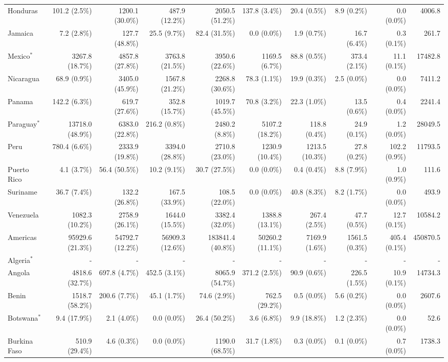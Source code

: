 \begin{scriptsize}
\begin{landscape}
\begin{center}
\begin{longtable}[ht]{lrrrrrrrrr}
			Honduras&101.2 (2.5\%)&1200.1 (30.0\%)&487.9 (12.2\%)&2050.5 (51.2\%)&137.8 (3.4\%)&20.4 (0.5\%)&8.9 (0.2\%)&0.0 (0.0\%)&4006.8\\
			Jamaica&7.2 (2.8\%)&127.7 (48.8\%)&25.5 (9.7\%)&82.4 (31.5\%)&0.0 (0.0\%)&1.9 (0.7\%)&16.7 (6.4\%)&0.3 (0.1\%)&261.7\\
			Mexico$^*$&3267.8 (18.7\%)&4857.8 (27.8\%)&3763.8 (21.5\%)&3950.6 (22.6\%)&1169.5 (6.7\%)&88.8 (0.5\%)&373.4 (2.1\%)&11.1 (0.1\%)&17482.8\\
			Nicaragua&68.9 (0.9\%)&3405.0 (45.9\%)&1567.8 (21.2\%)&2268.8 (30.6\%)&78.3 (1.1\%)&19.9 (0.3\%)&2.5 (0.0\%)&0.0 (0.0\%)&7411.2\\
			Panama&142.2 (6.3\%)&619.7 (27.6\%)&352.8 (15.7\%)&1019.7 (45.5\%)&70.8 (3.2\%)&22.3 (1.0\%)&13.5 (0.6\%)&0.4 (0.0\%)&2241.4\\
			Paraguay$^*$&13718.0 (48.9\%)&6383.0 (22.8\%)&216.2 (0.8\%)&2480.2 (8.8\%)&5107.2 (18.2\%)&118.8 (0.4\%)&24.9 (0.1\%)&1.2 (0.0\%)&28049.5\\
			Peru&780.4 (6.6\%)&2333.9 (19.8\%)&3394.0 (28.8\%)&2710.8 (23.0\%)&1230.9 (10.4\%)&1213.5 (10.3\%)&27.8 (0.2\%)&102.2 (0.9\%)&11793.5\\
			Puerto Rico&4.1 (3.7\%)&56.4 (50.5\%)&10.2 (9.1\%)&30.7 (27.5\%)&0.0 (0.0\%)&0.4 (0.4\%)&8.8 (7.9\%)&1.0 (0.9\%)&111.6\\
			Suriname&36.7 (7.4\%)&132.2 (26.8\%)&167.5 (33.9\%)&108.5 (22.0\%)&0.0 (0.0\%)&40.8 (8.3\%)&8.2 (1.7\%)&0.0 (0.0\%)&493.9\\
			Venezuela&1082.3 (10.2\%)&2758.9 (26.1\%)&1644.0 (15.5\%)&3382.4 (32.0\%)&1388.8 (13.1\%)&267.4 (2.5\%)&47.7 (0.5\%)&12.7 (0.1\%)&10584.2\\\hline
			Americas&95929.6 (21.3\%)&54792.7 (12.2\%)&56909.3 (12.6\%)&183841.4 (40.8\%)&50260.2 (11.1\%)&7169.9 (1.6\%)&1561.5 (0.3\%)&405.4 (0.1\%)&450870.5\\\hline
			Algeria$^*$&-&-&-&-&-&-&-&-&-\\
			Angola&4818.6 (32.7\%)&697.8 (4.7\%)&452.5 (3.1\%)&8065.9 (54.7\%)&371.2 (2.5\%)&90.9 (0.6\%)&226.5 (1.5\%)&10.9 (0.1\%)&14734.3\\
			Benin&1518.7 (58.2\%)&200.6 (7.7\%)&45.1 (1.7\%)&74.6 (2.9\%)&762.5 (29.2\%)&0.5 (0.0\%)&5.6 (0.2\%)&0.0 (0.0\%)&2607.6\\
			Botswana$^*$&9.4 (17.9\%)&2.1 (4.0\%)&0.0 (0.0\%)&26.4 (50.2\%)&3.6 (6.8\%)&9.9 (18.8\%)&1.2 (2.3\%)&0.0 (0.0\%)&52.6\\
			Burkina Faso&510.9 (29.4\%)&4.6 (0.3\%)&0.0 (0.0\%)&1190.0 (68.5\%)&31.7 (1.8\%)&0.3 (0.0\%)&0.1 (0.0\%)&0.7 (0.0\%)&1738.3\\

\end{longtable}
\end{center}
\end{landscape}
\end{scriptsize}
